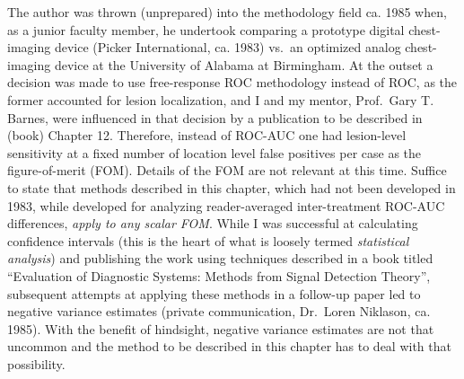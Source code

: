\documentclass[
]{book}
\begin{document}
The author was thrown (unprepared) into the methodology field ca. 1985 when, as a junior faculty member, he undertook comparing a prototype digital chest-imaging device (Picker International, ca. 1983) vs.~an optimized analog chest-imaging device at the University of Alabama at Birmingham. At the outset a decision was made to use free-response ROC methodology instead of ROC, as the former accounted for lesion localization, and I and my mentor, Prof.~Gary T. Barnes, were influenced in that decision by a publication \citep{bunch1977free} to be described in (book) Chapter 12. Therefore, instead of ROC-AUC one had lesion-level sensitivity at a fixed number of location level false positives per case as the figure-of-merit (FOM). Details of the FOM are not relevant at this time. Suffice to state that methods described in this chapter, which had not been developed in 1983, while developed for analyzing reader-averaged inter-treatment ROC-AUC differences, \emph{apply to any scalar FOM}. While I was successful at calculating confidence intervals (this is the heart of what is loosely termed \emph{statistical analysis}) and publishing the work \citep{Chakraborty1986DigitalVsConv} using techniques described in a book \citep{RN412} titled ``Evaluation of Diagnostic Systems: Methods from Signal Detection Theory'', subsequent attempts at applying these methods in a follow-up paper \citep{Niklason1986SimulatedPulmonary} led to negative variance estimates (private communication, Dr.~Loren Niklason, ca. 1985). With the benefit of hindsight, negative variance estimates are not that uncommon and the method to be described in this chapter has to deal with that possibility.
\end{document}

